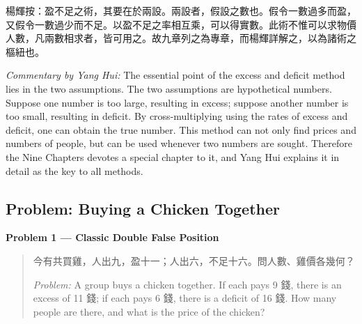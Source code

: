 \documentclass[11pt,a4paper]{article}
\newcommand{\zh}[1]{{#1}}
\newenvironment{chproblem}[1][]{%
  \par\medskip\noindent\textbf{\textcolor{sectioncolor}{#1}}\par\nopagebreak
  \begin{quote}\small
}{%
  \end{quote}\medskip
}
\newenvironment{chpassage}{%
  \par\medskip
  \begin{center}
  \begin{minipage}{0.95\textwidth}
  \setlength{\parindent}{2em}
  \linespread{1.3}\selectfont
}{%
  \end{minipage}
  \end{center}
  \medskip
}
\begin{document}
\begin{chpassage}
\zh{楊輝按：盈不足之術，其要在於兩設。兩設者，假設之數也。假令一數過多而盈，又假令一數過少而不足。以盈不足之率相互乘，可以得實數。此術不惟可以求物價人數，凡兩數相求者，皆可用之。故九章列之為專章，而楊輝詳解之，以為諸術之樞紐也。}

\medskip
\textit{Commentary by Yang Hui:} The essential point of the excess and deficit
method lies in the two assumptions. The two assumptions are hypothetical
numbers. Suppose one number is too large, resulting in excess; suppose another
number is too small, resulting in deficit. By cross-multiplying using the
rates of excess and deficit, one can obtain the true number. This method can
not only find prices and numbers of people, but can be used whenever two
numbers are sought. Therefore the Nine Chapters devotes a special chapter to
it, and Yang Hui explains it in detail as the key to all methods.
\end{chpassage}

\subsection{Problem: Buying a Chicken Together}

\begin{chproblem}[Problem 1 --- Classic Double False Position]
\zh{今有共買雞，人出九，盈十一；人出六，不足十六。問人數、雞價各幾何？}

\medskip
\textit{Problem:} A group buys a chicken together. If each pays 9 \zh{錢},
there is an excess of 11 \zh{錢}; if each pays 6 \zh{錢}, there is a deficit
of 16 \zh{錢}. How many people are there, and what is the price of the
chicken?
\end{chproblem}
\end{document}
